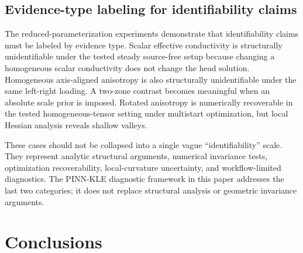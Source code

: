 \documentclass[pdflatex,sn-mathphys,Numbered,iicol]{sn-jnl}
\begin{document}
\subsection{Evidence-type labeling for identifiability claims}
\label{sec:disc-evidence}

The reduced-parameterization experiments demonstrate that identifiability
claims must be labeled by evidence type. Scalar effective conductivity is
structurally unidentifiable under the tested steady source-free setup because
changing a homogeneous scalar conductivity does not change the head solution.
Homogeneous axis-aligned anisotropy is also structurally unidentifiable under
the same left-right loading. A two-zone contrast becomes meaningful when an
absolute scale prior is imposed. Rotated anisotropy is numerically recoverable
in the tested homogeneous-tensor setting under multistart optimization, but local Hessian analysis reveals
shallow valleys.

These cases should not be collapsed into a single vague ``identifiability''
scale. They represent analytic structural arguments, numerical invariance
tests, optimization recoverability, local-curvature uncertainty, and
workflow-limited diagnostics. The PINN-KLE diagnostic framework in this paper
addresses the last two categories; it does not replace structural analysis or
geometric invariance arguments.

\section{Conclusions}
\label{sec:conclusions}
\end{document}
